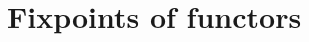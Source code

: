 \documentclass[thesis.tex]{subfiles}
\begin{document}


\section{Fixpoints of functors}
\label{sec:fixpoint}
\end{document}
